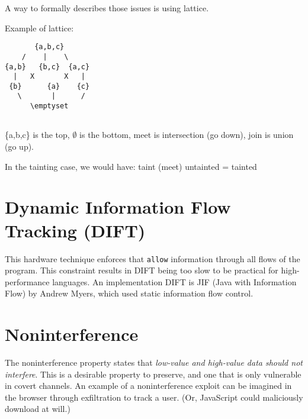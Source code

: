 \documentclass[twoside]{article}
\begin{document}
A way to formally describes those issues is using lattice.

Example of lattice:

\begin{verbatim}
       {a,b,c}
    /    |    \
{a,b}   {b,c}  {a,c}
  |   X       X   |
 {b}      {a}    {c}
   \       |      /
      \emptyset
 
\end{verbatim}

\{a,b,c\} is the top, $\emptyset$ is the bottom, meet is intersection (go down), join is union (go up).

In the tainting case, we would have: taint (meet) untainted = tainted

\section{Dynamic Information Flow Tracking (DIFT)}

This hardware technique enforces that \texttt{allow} information through all flows of the program. This constraint results in \textsc{DIFT} being too slow to be practical for high-performance languages.
An implementation \textsc{DIFT} is \textsc{JIF} (Java with Information Flow) by Andrew Myers, which used static information flow control.

\section{Noninterference}

The noninterference property states that \textit{low-value and high-value data should not interfere}.
This is a desirable property to preserve, and one that is only vulnerable in covert channels. An example of a noninterference exploit can be imagined in the browser through exfiltration to track a user. (Or, JavaScript could maliciously download at will.) 
\end{document}
